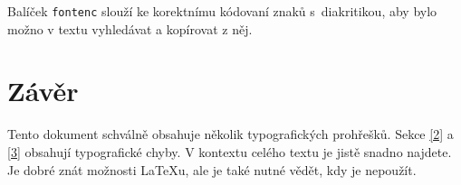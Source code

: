 \documentclass[10pt,twocolumn]{article}
\begin{document}
Balíček \texttt{fontenc} slouží ke korektnímu kódovaní znaků s~diakritikou, aby bylo možno v textu vyhledávat a kopírovat z něj.

\section{Závěr} \label{5}
Tento dokument schválně obsahuje několik typografických prohřešků.
Sekce \ref{2} a \ref{3} obsahují typografické chyby.
V kontextu celého textu je jistě snadno najdete.
Je dobré znát možnosti \LaTeX u, ale je také nutné vědět, kdy je nepoužít.
\end{document}
